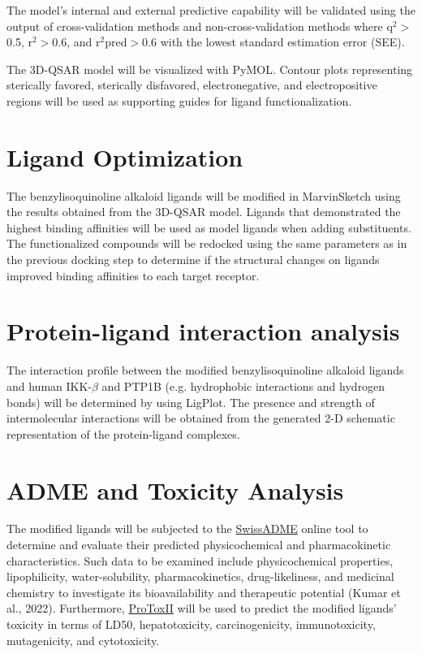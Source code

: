 The model's internal and external predictive capability will be validated using the output of cross-validation methods and non-cross-validation methods where q$^2$$>$0.5, r$^2$$>$0.6, and r$^2$pred$>$0.6 with the lowest standard estimation error (SEE). 

The 3D-QSAR model will be visualized with PyMOL. Contour plots representing sterically favored, sterically disfavored, electronegative, and electropositive regions will be used as supporting guides for ligand functionalization. 

\section{Ligand Optimization}
The benzylisoquinoline alkaloid ligands will be modified in MarvinSketch using the results obtained from the 3D-QSAR model. Ligands that demonstrated the highest binding affinities will be used as model ligands when adding substituents. The functionalized compounds will be redocked using the same parameters as in the previous docking step to determine if the structural changes on ligands improved binding affinities to each target receptor.

\section{Protein-ligand interaction analysis}
The interaction profile between the modified benzylisoquinoline alkaloid ligands and human IKK-$\beta$ and PTP1B (e.g. hydrophobic interactions and hydrogen bonds) will be determined by using LigPlot. The presence and strength of intermolecular interactions will be obtained from the generated 2-D schematic representation of the protein-ligand complexes. 

\section{ADME and Toxicity Analysis}
The modified ligands will be subjected to the \href{http://www.swissadme.ch/}{SwissADME} online tool to determine and evaluate their predicted physicochemical and pharmacokinetic characteristics. Such data to be examined include physicochemical properties, lipophilicity, water-solubility, pharmacokinetics, drug-likeliness, and medicinal chemistry to investigate its bioavailability and therapeutic potential (Kumar et al., 2022). Furthermore, \href{https://tox-new.charite.de/protox_II/} {ProToxII} will be used to predict the modified ligands' toxicity in terms of LD50, hepatotoxicity, carcinogenicity, immunotoxicity, mutagenicity, and cytotoxicity. 

